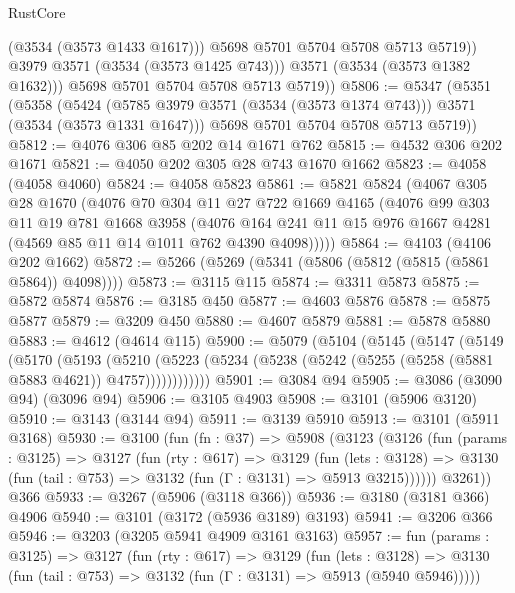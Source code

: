 \begin{lexlean}{RustCore}
\begin{coremodule}
                  (@3534 (@3573 @1433 @1617)))
                @5698
                @5701
                @5704
                @5708
                @5713
                @5719))
            @3979
            @3571
            (@3534 (@3573 @1425 @743)))
          @3571
          (@3534 (@3573 @1382 @1632)))
        @5698
        @5701
        @5704
        @5708
        @5713
        @5719))
@5806 := @5347
    (@5351
      (@5358
        (@5424 (@5785 @3979 @3571 (@3534 (@3573 @1374 @743))) @3571 (@3534 (@3573 @1331 @1647)))
        @5698
        @5701
        @5704
        @5708
        @5713
        @5719))
@5812 := @4076 @306 @85 @202 @14 @1671 @762
@5815 := @4532 @306 @202 @1671
@5821 := @4050 @202 @305 @28 @743 @1670 @1662
@5823 := @4058 (@4058 @4060)
@5824 := @4058 @5823
@5861 := @5821
    @5824
    (@4067
      @305
      @28
      @1670
      (@4076
        @70
        @304
        @11
        @27
        @722
        @1669
        @4165
        (@4076
          @99
          @303
          @11
          @19
          @781
          @1668
          @3958
          (@4076 @164 @241 @11 @15 @976 @1667 @4281 (@4569 @85 @11 @14 @1011 @762 @4390 @4098)))))
@5864 := @4103 (@4106 @202 @1662)
@5872 := @5266 (@5269 (@5341 (@5806 (@5812 (@5815 (@5861 @5864)) @4098))))
@5873 := @3115 @115
@5874 := @3311 @5873
@5875 := @5872 @5874
@5876 := @3185 @450
@5877 := @4603 @5876
@5878 := @5875 @5877
@5879 := @3209 @450
@5880 := @4607 @5879
@5881 := @5878 @5880
@5883 := @4612 (@4614 @115)
@5900 := @5079
    (@5104
      (@5145
        (@5147
          (@5149
            (@5170
              (@5193
                (@5210
                  (@5223 (@5234 (@5238 (@5242 (@5255 (@5258 (@5881 @5883 @4621)) @4757))))))))))))
@5901 := @3084 @94
@5905 := @3086 (@3090 @94) (@3096 @94)
@5906 := @3105 @4903
@5908 := @3101 (@5906 @3120)
@5910 := @3143 (@3144 @94)
@5911 := @3139 @5910
@5913 := @3101 (@5911 @3168)
@5930 := @3100
    (fun (fn : @37) =>
    @5908
      (@3123
        (@3126
          (fun (params : @3125) =>
          @3127
            (fun (rty : @617) =>
            @3129
              (fun (lets : @3128) =>
              @3130 (fun (tail : @753) => @3132 (fun (Γ : @3131) => @5913 @3215))))))
        @3261))
    @366
@5933 := @3267 (@5906 (@3118 @366))
@5936 := @3180 (@3181 @366) @4906
@5940 := @3101 (@3172 (@5936 @3189) @3193)
@5941 := @3206 @366
@5946 := @3203 (@3205 @5941 @4909 @3161 @3163)
@5957 := fun (params : @3125) =>
  @3127
    (fun (rty : @617) =>
    @3129
      (fun (lets : @3128) =>
      @3130 (fun (tail : @753) => @3132 (fun (Γ : @3131) => @5913 (@5940 @5946)))))

\end{coremodule}
\end{lexlean}
